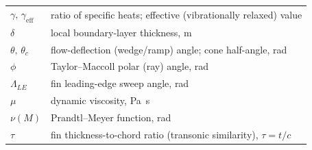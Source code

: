 \begin{longtable}{@{}l@{\hskip 2em}l@{}}
$\gamma,\,\gamma_\mathrm{eff}$ & ratio of specific heats; effective (vibrationally relaxed) value \\
$\delta$ & local boundary-layer thickness, \si{\meter} \\
$\theta,\,\theta_c$ & flow-deflection (wedge/ramp) angle; cone half-angle, \si{\radian} \\
$\phi$ & Taylor--Maccoll polar (ray) angle, \si{\radian} \\
$\Lambda_{LE}$ & fin leading-edge sweep angle, \si{\radian} \\
$\mu$ & dynamic viscosity, \si{\pascal\second} \\
$\nu(M)$ & Prandtl--Meyer function, \si{\radian} \\
$\tau$ & fin thickness-to-chord ratio (transonic similarity), $\tau = t/c$ \\
\end{longtable}
